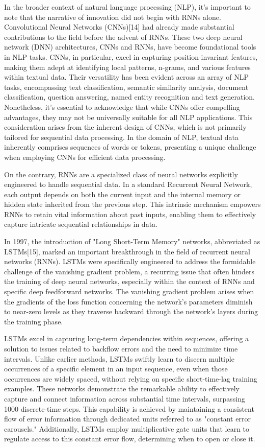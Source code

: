 \documentclass[conference]{IEEEtran}
\begin{document}
In the broader context of natural language processing (NLP), it's important to note that the narrative of innovation did not begin with RNNs alone. Convolutional Neural Networks (CNNs)[14] had already made substantial contributions to the field before the advent of RNNs. These two deep neural network (DNN) architectures, CNNs and RNNs, have become foundational tools in NLP tasks. CNNs, in particular, excel in capturing position-invariant features, making them adept at identifying local patterns, n-grams, and various features within textual data. Their versatility has been evident across an array of NLP tasks, encompassing text classification, semantic similarity analysis, document classification, question answering, named entity recognition and text generation. Nonetheless, it's essential to acknowledge that while CNNs offer compelling advantages, they may not be universally suitable for all NLP applications. This consideration arises from the inherent design of CNNs, which is not primarily tailored for sequential data processing. In the domain of NLP, textual data inherently comprises sequences of words or tokens, presenting a unique challenge when employing CNNs for efficient data processing.


On the contrary, RNNs are a specialized class of neural networks explicitly engineered to handle sequential data. In a standard Recurrent Neural Network, each output depends on both the current input and the internal memory or hidden state inherited from the previous step. This intrinsic mechanism empowers RNNs to retain vital information about past inputs, enabling them to effectively capture intricate sequential relationships in data. 




In 1997, the introduction of "Long Short-Term Memory" networks, abbreviated as LSTMs[15], marked an important breakthrough in the field of recurrent neural networks (RNNs). LSTMs were specifically engineered to address the formidable challenge of the vanishing gradient problem, a recurring issue that often hinders the training of deep neural networks, especially within the context of RNNs and specific deep feedforward networks. The vanishing gradient problem arises when the gradients of the loss function concerning the network's parameters diminish to near-zero levels as they traverse backward through the network's layers during the training phase.


LSTMs excel in capturing long-term dependencies within sequences, offering a solution to issues related to backflow errors and the need to minimize time intervals. Unlike earlier methods, LSTMs swiftly learn to discern multiple occurrences of a specific element in an input sequence, even when those occurrences are widely spaced, without relying on specific short-time-lag training examples. These networks demonstrate the remarkable ability to effectively capture and connect information across substantial time intervals, surpassing 1000 discrete-time steps. This capability is achieved by maintaining a consistent flow of error information through dedicated units referred to as "constant error carousels." Additionally, LSTMs employ multiplicative gate units that learn to regulate access to this constant error flow, determining when to open or close it.
\end{document}
